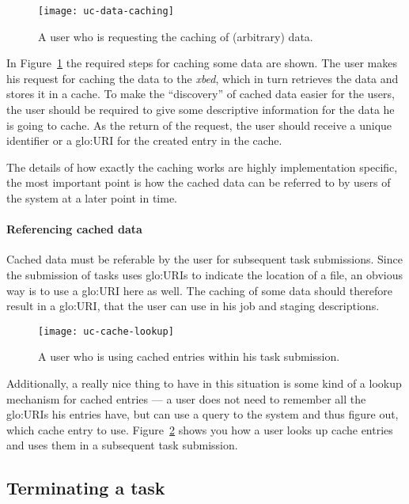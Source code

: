 \begin{figure}[h]
  \centering
  \texttt{[image: uc-data-caching]}
  \caption[UC  Data  Caching]{A user  who  is  requesting  the caching  of
    (arbitrary) data.}
  \label{fig:uc-data-caching}
\end{figure}

In  Figure~\ref{fig:uc-data-caching} the required  steps for  caching some
data are  shown. The user  makes his request  for caching the data  to the
\emph{xbed}, which in turn retrieves the data and stores it in a cache. To
make  the ``discovery''  of cached  data easier  for the  users,  the user
should be required to give some descriptive information for the data he is
going to  cache. As the return of  the request, the user  should receive a
unique identifier or a \gls{glo:URI} for the created entry in the cache.

The details  of how  exactly the caching  works are  highly implementation
specific, the most important point is  how the cached data can be referred
to by users of the system at a later point in time.

\paragraph{Referencing cached  data}

Cached data must be referable by the user for subsequent task submissions.
Since the submission of tasks uses \gls{glo:URI}s to indicate the location
of a  file, an obvious  way is  to use a  \gls{glo:URI} here as  well. The
caching of some data should  therefore result in a \gls{glo:URI}, that the
user can use in his job and staging descriptions.

\begin{figure}[h]
  \centering
  \texttt{[image: uc-cache-lookup]}
  \caption[UC  Cache Lookup]{A user  who  is using cached entries within
    his task submission.}
  \label{fig:uc-cache-lookup}
\end{figure}

Additionally, a really  nice thing to have in this  situation is some kind
of a lookup mechanism for cached  entries --- \ie a user does not need to
remember all the  \gls{glo:URI}s his entries have, but can  use a query to
the    system   and   thus    figure   out,    which   cache    entry   to
use. Figure~\ref{fig:uc-cache-lookup} shows you  how a user looks up cache
entries and uses them in a subsequent task submission.

\subsection{Terminating a task}
\label{sec:uc-terminate-task}

